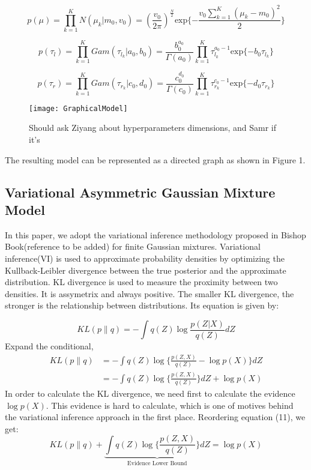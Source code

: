 \documentclass[runningheads]{llncs}
\begin{document}
\begin{equation}
p(\mu)= \prod_{k=1}^{K} N(\mu_k|m_0,v_0)= (\frac{v_0}{2\pi})^{\frac{N}{2}}\text{exp}\{-\frac{v_0\sum_{k=1}^{K}(\mu_k - m_0)^2}{2}\}
\end{equation}

\begin{equation}
p(\tau_l)= \prod_{k=1}^{K} Gam(\tau_{l_k}|a_0,b_0)= \frac{b_0^{a_0}}{\Gamma(a_{0})}\prod_{k=1}^{K}\tau_{l_k}^{a_0-1}\text{exp}\{-b_0\tau_{l_k}\}
\end{equation}

\begin{equation}
p(\tau_r)= \prod_{k=1}^{K} Gam(\tau_{r_k}|c_0,d_0)= \frac{c_0^{d_0}}{\Gamma(c_{0})}\prod_{k=1}^{K}\tau_{r_k}^{c_0-1}\text{exp}\{-d_0\tau_{r_k}\}
\end{equation}
\begin{wrapfigure}{r}{0.5\textwidth} %
   \centering
   \texttt{[image: GraphicalModel]}
   \caption[width=0.5\textwidth]{Should ask Ziyang about hyperparameters dimensions, 
   and Samr if it's} \label{fig1}
\end{wrapfigure}

The resulting model can be represented as a directed graph as shown in Figure 1.


\subsection{Variational Asymmetric Gaussian Mixture Model}

In this paper, we adopt the variational inference methodology proposed in Bishop Book(reference to be added) for finite Gaussian mixtures. 
Variational inference(VI) is used to approximate probability densities by optimizing the Kullback-Leibler divergence between the true posterior
and the approximate distribution. KL divergence is used to measure the proximity between two densities. It is assymetrix and always positive.
The smaller KL divergence, the stronger is the relationship between distributions. Its equation is given by:

\begin{equation}
   KL(p\parallel q) = - \int q(Z) \log{\frac{p(Z|X)}{q(Z)}}dZ
\end{equation}
Expand the conditional, 
\begin{equation}
   \begin{split}
   KL(p\parallel q) & = - \int q(Z) \log\{\frac{p(Z,X)}{q(Z)}-\log p(X)\}dZ \\ &
   = - \int q(Z) \log\{\frac{p(Z,X)}{q(Z)}\}dZ + \log p(X)
   \end{split}
\end{equation}
In order to calculate the KL divergence, we need first to calculate the evidence $\log p(X)$. 
This evidence is hard to calculate, which is one of motives behind the variational inference approach in the first place.
Reordering equation (11), we get: 
\begin{equation}
   KL(p\parallel q) + \underbrace{\int q(Z) \log\{\frac{p(Z,X)}{q(Z)}\}dZ}_\text{Evidence Lower Bound}= \log p(X)
\end{equation}
\end{document}
